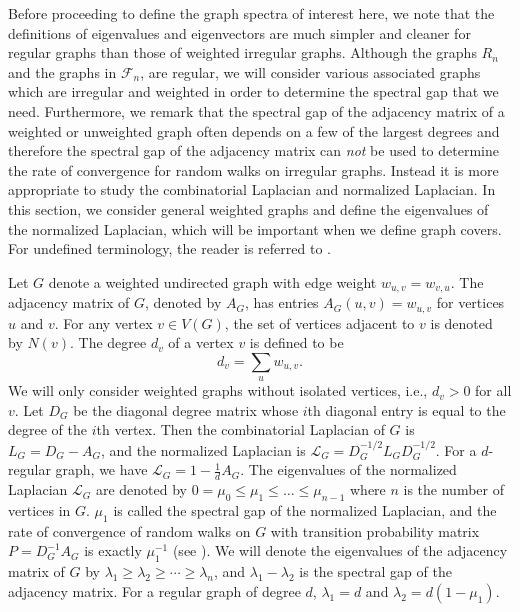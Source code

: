 Before proceeding to define the graph spectra of interest here, we note that
the definitions of eigenvalues and eigenvectors are much simpler and cleaner for regular graphs
than those of weighted irregular graphs. Although the graphs 
$R_n$ and the graphs in $\mathcal{F}_n$, are regular, we will consider various
associated graphs which are irregular and weighted in order to determine the spectral
gap that we need.
Furthermore, we remark that the spectral gap of the adjacency matrix of a weighted or unweighted graph often depends
on a few of the largest degrees and therefore the spectral gap of the adjacency matrix  can {\it  not}
be used to determine the rate of convergence for random walks on irregular graphs.  Instead it is more appropriate
to study the combinatorial Laplacian and normalized Laplacian.
In this section, we consider general weighted graphs and define the eigenvalues of the normalized Laplacian,
which will be important when we define graph covers.
For undefined terminology, the reader is referred to  \cite{Chung1997}.




Let $G$ denote a weighted undirected graph with edge weight $w_{u,v} = w_{v,u}$. The adjacency matrix
of $G$, denoted by $A_G$, has entries $A_G(u,v)= w_{u,v}$ for vertices $u$ and $v$.  For any
vertex $v \in V(G)$, the set of vertices adjacent to $v$ is denoted by $N(v)$.
The degree $d_v$ of a vertex $v$ is defined to be
\[ d_v = \sum_u w_{u,v}. \]
We will only consider weighted graphs without isolated vertices, i.e., $d_v > 0$ for all $v$.
Let $D_G$ be the diagonal 
degree matrix whose $i$th diagonal entry is equal to the degree of the $i$th
vertex.  Then the combinatorial Laplacian of $G$ is $L_G = D_G - A_G$, 
and the normalized Laplacian is $\mathcal{L}_G = D_G^{-1/2} L_G D_G^{-1/2}$.
For a $d$-regular graph, we have $\mathcal{L}_G =1 - \frac{1}{d} A_G$.
The eigenvalues of the normalized Laplacian $\mathcal{L}_G$ are denoted by
$0=\mu_0 \leq \mu_1 \leq \ldots \leq \mu_{n-1}$ where $n$ is the number of vertices in $G$.
$\mu_1$ is called the spectral gap of the normalized Laplacian, and the rate of convergence of random walks on $G$ 
with transition probability matrix $P=D_G^{-1} A_G$ is exactly $\mu_1^{-1}$ (see \cite{Chung1997}).  We will denote the eigenvalues of 
the adjacency matrix of $G$ by $\lambda_1 \geq \lambda_2 \geq \cdots \geq \lambda_n$,
and $\lambda_1 - \lambda_2$ is the spectral gap of the adjacency matrix. For a regular graph of degree $d$, $\lambda_1=d$
and $\lambda_2 = d (1-\mu_1)$.


